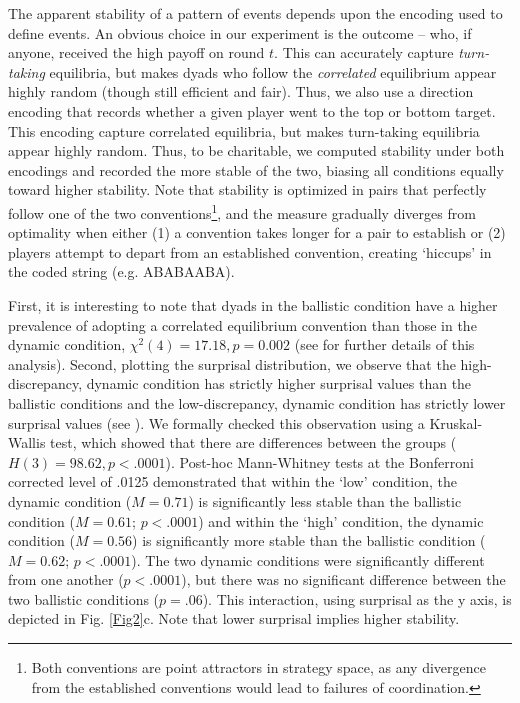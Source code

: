 \documentclass[10pt,letterpaper]{article}
\begin{document}
The apparent stability of a pattern of events depends upon the encoding used to define events. An obvious choice in our experiment is the outcome -- who, if anyone, received the high payoff on round $t$. This can accurately capture \emph{turn-taking} equilibria, but makes dyads who follow the \emph{correlated} equilibrium appear highly random (though still efficient and fair). Thus, we also use a direction encoding that records whether a given player went to the top or bottom target. This encoding capture correlated equilibria, but makes turn-taking equilibria appear highly random. Thus, to be charitable, we computed stability under both encodings and recorded the more stable of the two, biasing all conditions equally toward higher stability. Note that stability is optimized in pairs that perfectly follow one of the two conventions\footnote{Both conventions are point attractors in strategy space, as any divergence from the established conventions would lead to failures of coordination.}, and the measure gradually diverges from optimality when either (1) a convention takes longer for a pair to establish or (2) players attempt to depart from an established convention, creating `hiccups' in the coded string (e.g. ABABAABA).

First, it is interesting to note that dyads in the ballistic condition have a higher prevalence of adopting a correlated equilibrium convention than those in the dynamic condition, $\chi^2(4) = 17.18, p = 0.002$ (see  for further details of this analysis). Second, plotting the surprisal distribution, we observe that the high-discrepancy, dynamic condition has strictly higher surprisal values than the ballistic conditions and the low-discrepancy, dynamic condition has strictly lower surprisal values  (see ). We formally checked this observation using a Kruskal-Wallis test, which showed that there are differences between the groups ($H(3) = 98.62, p < .0001$). Post-hoc Mann-Whitney tests at the Bonferroni corrected level of .0125 demonstrated that within the `low' condition, the dynamic condition ($M = 0.71$) is significantly less stable than the ballistic condition ($M=0.61$; $p < .0001$) and within the `high' condition, the dynamic condition ($M=0.56$) is significantly more stable than the ballistic condition ($M=0.62$; $p < .0001$). The two dynamic conditions were significantly different from one another ($p < .0001$), but there was no significant difference between the two ballistic conditions ($p = .06$). This interaction, using surprisal as the y axis, is depicted in Fig. \ref{Fig2}c. Note that lower surprisal implies higher stability.
\end{document}
